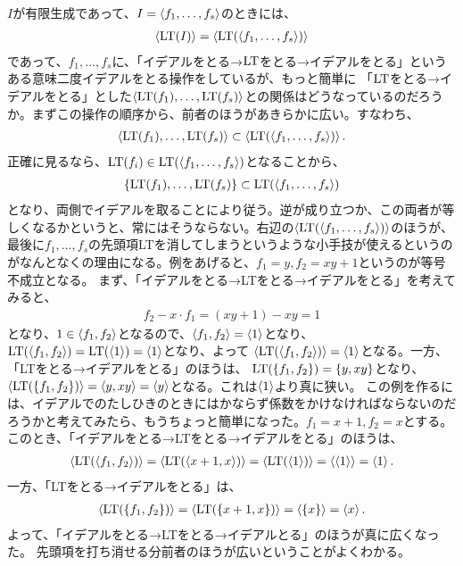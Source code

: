 $I$が有限生成であって、$I=\gen{f_1,\dots,f_s}$のときには、
\begin{align}
  \gen{\LT(I)} = \gen{\LT(\gen{f_1,\dots,f_s})}
\end{align}
であって、$f_1,\dots,f_s$に、「イデアルをとる→$\LT$をとる→イデアルをとる」という
ある意味二度イデアルをとる操作をしているが、もっと簡単に
「$\LT$をとる→イデアルをとる」とした$\gen{\LT(f_1),\dots,\LT(f_s)}$との関係はどうなっているのだろうか。まずこの操作の順序から、前者のほうがあきらかに広い。すなわち、
\begin{align}
  \gen{\LT(f_1),\dots,\LT(f_s)} \subset \gen{\LT(\gen{f_1,\dots,f_s})}.
\end{align}
正確に見るなら、$\LT(f_i) \in \LT(\gen{f_1,\dots,f_s})$となることから、
\begin{align}
  \set{\LT(f_1),\dots,\LT(f_s)} \subset \LT(\gen{f_1,\dots,f_s})
\end{align}
となり、両側でイデアルを取ることにより従う。逆が成り立つか、この両者が等しくなるかというと、常にはそうならない。右辺の$\gen{\LT(\gen{f_1,\dots,f_s})}$のほうが、
最後に$f_1,\dots,f_s$の先頭項LTを消してしまうというような小手技が使えるというのがなんとなくの理由になる。例をあげると、$f_1 = y, f_2 = xy+1$というのが等号不成立となる。
まず、「イデアルをとる→LTをとる→イデアルをとる」を考えてみると、
\begin{align}
  f_2 - x\cdot f_1 = (xy+1) - xy = 1
\end{align}
となり、$1\in \gen{f_1, f_2}$となるので、$\gen{f_1,f_2} = \gen{1}$となり、
$\LT(\gen{f_1,f_2}) = \LT(\gen{1}) = \gen{1}$となり、よって
$\gen{\LT(\gen{f_1,f_2})} = \gen{1}$となる。一方、「LTをとる→イデアルをとる」のほうは、
$\LT(\set{f_1,f_2}) = \set{y,xy}$となり、$\gen{\LT(\set{f_1,f_2})} = \gen{y,xy} = \gen{y}$となる。これは$\gen{1}$より真に狭い。
この例を作るには、イデアルでのたしひきのときにはかならず係数をかけなければならないのだろうかと考えてみたら、もうちょっと簡単になった。$f_1 = x+1,f_2 = x$とする。
このとき、「イデアルをとる→LTをとる→イデアルをとる」のほうは、
\begin{align}
  \gen{\LT(\gen{f_1,f_2})} = \gen{\LT(\gen{x+1,x})}
  =
  \gen{\LT(\gen{1})}
  =
  \gen{\gen{1}}
  =
  \gen{1}.
\end{align}
一方、「LTをとる→イデアルをとる」は、
\begin{align}
  \gen{\LT(\set{f_1,f_2})}
  =
  \gen{\LT(\set{x+1,x})}
  =
  \gen{\set{x}}
  =
  \gen{x}.
\end{align}
よって、「イデアルをとる→LTをとる→イデアルとる」のほうが真に広くなった。
先頭項を打ち消せる分前者のほうが広いということがよくわかる。


